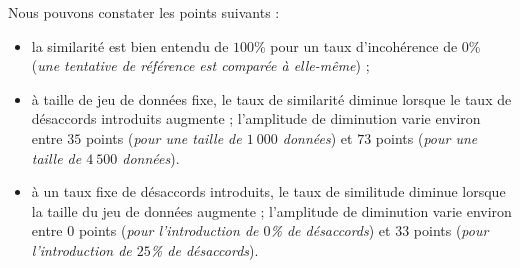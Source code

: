 			Nous pouvons constater les points suivants :
			\begin{itemize}
				\item la similarité est bien entendu de $100$\% pour un taux d'incohérence de $0$\% (\textit{une tentative de référence est comparée à elle-même}) ;
				\item à taille de jeu de données fixe, le taux de similarité diminue lorsque le taux de désaccords introduits augmente ;
				l'amplitude de diminution varie environ entre $35$ points (\textit{pour une taille de $1~000$ données}) et $73$ points (\textit{pour une taille de $4~500$ données}).
				\item à un taux fixe de désaccords introduits, le taux de similitude diminue lorsque la taille du jeu de données augmente ;
				l'amplitude de diminution varie environ entre $0$ points (\textit{pour l'introduction de $0$\% de désaccords}) et $33$ points (\textit{pour l'introduction de $25$\% de désaccords}).
			\end{itemize}
			
